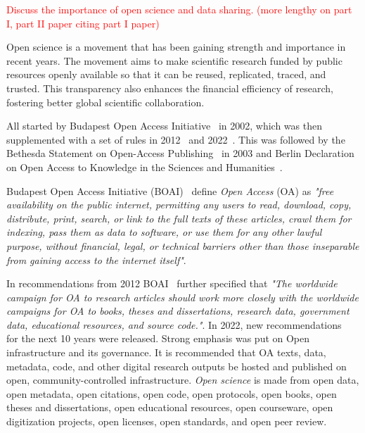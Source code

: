 \documentclass{article}
\begin{document}
\textcolor{red}{Discuss the importance of open science and data sharing. (more lengthy on part I, part II paper citing part I paper)}

Open science is a movement that has been gaining strength and importance in recent years.
The movement aims to make scientific research funded by public resources openly available so that it can be reused, replicated, traced, and trusted. This transparency also enhances the financial efficiency of research, fostering better global scientific collaboration.

All started by Budapest Open Access Initiative~\cite{2012_OSI} in 2002, which was then supplemented with a set of rules in 2012~\cite{2012_OSI} and 2022~\cite{2022_OSI}.  This was followed by the Bethesda Statement on Open-Access Publishing~\cite{2003_Bethesda} in 2003 and Berlin Declaration on Open Access to Knowledge in the Sciences and Humanities~\cite{2003_Max_Planck}.

Budapest Open Access Initiative (BOAI)~\cite{2002_OSI} define \textit{Open Access} (OA) as \textit{"free availability on the public internet, permitting any users to read, download, copy, distribute, print, search, or link to the full texts of these articles, crawl them for indexing, pass them as data to software, or use them for any other lawful purpose, without financial, legal, or technical barriers other than those inseparable from gaining access to the internet itself"}.

In recommendations from 2012 BOAI~\cite{2012_OSI} further specified that \textit{"The worldwide campaign for OA to research articles should work more closely with the worldwide campaigns for OA to books, theses and dissertations, research data, government data, educational resources, and source code."}. In 2022, new recommendations~\cite{2022_OSI} for the next 10 years were released. Strong emphasis was put on Open infrastructure and its governance. It is recommended that OA texts, data, metadata, code, and other digital research outputs be hosted and published on open, community-controlled infrastructure. \textit{Open science} is made from open data, open metadata, open citations, open code, open protocols, open books, open theses and dissertations, open educational resources, open courseware, open digitization projects, open licenses, open standards, and open peer review.
\end{document}

